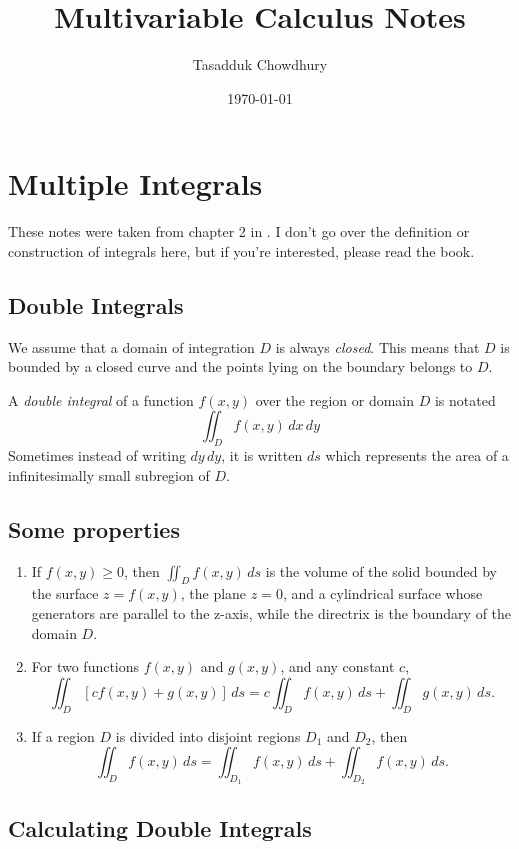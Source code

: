 \documentclass{article}
\begin{document}
\title{Multivariable Calculus Notes}
\author{Tasadduk Chowdhury}
\date{\today}
\maketitle


\section{Multiple Integrals}

These notes were taken from chapter 2 in \cite{piskunov2}. I don't go over the definition or construction of integrals here, but if you're interested, please read the book.


\subsection{Double Integrals}

We assume that a domain of integration $D$ is always \emph{closed}. This means that $D$ is bounded by a closed curve and the points lying on the boundary belongs to $D$.

A \emph{double integral} of a function $f(x,y)$ over the region or domain $D$ is notated
$$ \iint_D f(x,y) \, dx \, dy $$
Sometimes instead of writing $dy \, dy$, it is written $ds$ which represents the area of a infinitesimally small subregion of $D$.


\subsection*{Some properties}

\begin{enumerate}
\item If $f(x,y) \geq 0$, then $\iint_D f(x,y) \, ds$ is the volume of the solid bounded by the surface $z = f(x,y)$, the plane $z = 0$, and a cylindrical surface whose generators are parallel to the z-axis, while the directrix is the boundary of the domain $D$.
\item For two functions $f(x,y)$ and $g(x,y)$, and any constant $c$, 
$$\iint_D [c f(x,y)  + g(x,y) ] \, ds = c \iint_D f(x,y) \, ds + \iint_D g(x,y) \, ds. $$
\item If a region $D$ is divided into disjoint regions $D_1$ and $D_2$, then
$$ \iint_D f(x,y) \, ds = \iint_{D_1} f(x,y) \, ds + \iint_{D_2} f(x,y) \, ds. $$
\end{enumerate}


\subsection{Calculating Double Integrals}
\end{document}
